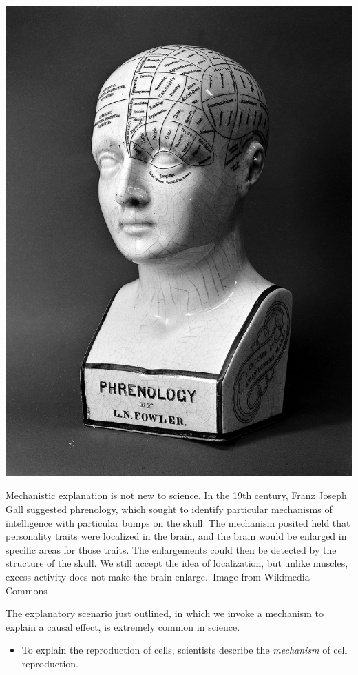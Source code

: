 \begin{refsection}
\begin{marginfigure}
\begin{center}
     \includegraphics{../images/phrenology.jpg}
\caption{Mechanistic explanation is not new to science. In the 19th century, Franz Joseph Gall suggested phrenology, which sought to identify particular mechanisms of intelligence with particular bumps on the skull. The mechanism posited held that personality traits were localized in the brain, and the brain would be enlarged in specific areas for those traits. The enlargements could then be detected by the structure of the skull. We still accept the idea of localization, but unlike muscles, excess activity does not make the brain enlarge. Image from Wikimedia Commons}
\end{center}
\label{fig:phrenology}
\end{marginfigure}

The explanatory scenario just outlined, in which we invoke a mechanism to explain a causal effect, is extremely common in science.

\begin{itemize}
\item To explain the reproduction of cells, scientists describe the \emph{mechanism} of cell reproduction.


\end{itemize}
\end{refsection}
